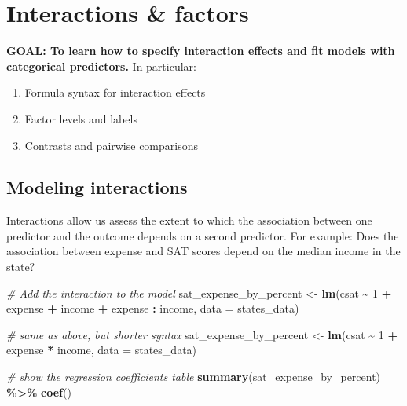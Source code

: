 \documentclass[
]{book}
\newenvironment{Shaded}{\begin{snugshade}}{\end{snugshade}}
\newcommand{\CommentTok}[1]{\textcolor[rgb]{0.56,0.35,0.01}{\textit{#1}}}
\newcommand{\DataTypeTok}[1]{\textcolor[rgb]{0.13,0.29,0.53}{#1}}
\newcommand{\DecValTok}[1]{\textcolor[rgb]{0.00,0.00,0.81}{#1}}
\newcommand{\KeywordTok}[1]{\textcolor[rgb]{0.13,0.29,0.53}{\textbf{#1}}}
\newcommand{\NormalTok}[1]{#1}
\newcommand{\OperatorTok}[1]{\textcolor[rgb]{0.81,0.36,0.00}{\textbf{#1}}}
\newcommand{\StringTok}[1]{\textcolor[rgb]{0.31,0.60,0.02}{#1}}
\providecommand{\tightlist}{%
  \setlength{\itemsep}{0pt}\setlength{\parskip}{0pt}}
\begin{document}
\hypertarget{interactions-factors}{%
\section{Interactions \& factors}\label{interactions-factors}}

\begin{alert}

\textbf{GOAL: To learn how to specify interaction effects and fit models with categorical predictors.} In particular:

\begin{enumerate}
\def\labelenumi{\arabic{enumi}.}
\tightlist
\item
  Formula syntax for interaction effects
\item
  Factor levels and labels
\item
  Contrasts and pairwise comparisons
\end{enumerate}

\end{alert}

\hypertarget{modeling-interactions}{%
\subsection{Modeling interactions}\label{modeling-interactions}}

Interactions allow us assess the extent to which the association between one predictor and the outcome depends on a second predictor. For example: Does the association between expense and SAT scores depend on the median income in the state?

\begin{Shaded}
\begin{Highlighting}[]
  \CommentTok{\# Add the interaction to the model}
\NormalTok{  sat\_expense\_by\_percent \textless{}{-}}\StringTok{ }\KeywordTok{lm}\NormalTok{(csat }\OperatorTok{\textasciitilde{}}\StringTok{ }\DecValTok{1} \OperatorTok{+}\StringTok{ }\NormalTok{expense }\OperatorTok{+}\StringTok{ }\NormalTok{income }\OperatorTok{+}\StringTok{ }\NormalTok{expense }\OperatorTok{:}\StringTok{ }\NormalTok{income, }\DataTypeTok{data =}\NormalTok{ states\_data)}

  \CommentTok{\# same as above, but shorter syntax}
\NormalTok{  sat\_expense\_by\_percent \textless{}{-}}\StringTok{ }\KeywordTok{lm}\NormalTok{(csat }\OperatorTok{\textasciitilde{}}\StringTok{ }\DecValTok{1} \OperatorTok{+}\StringTok{ }\NormalTok{expense }\OperatorTok{*}\StringTok{ }\NormalTok{income, }\DataTypeTok{data =}\NormalTok{ states\_data) }

  \CommentTok{\# show the regression coefficients table}
  \KeywordTok{summary}\NormalTok{(sat\_expense\_by\_percent) }\OperatorTok{\%\textgreater{}\%}\StringTok{ }\KeywordTok{coef}\NormalTok{() }
\end{Highlighting}
\end{Shaded}
\end{document}

